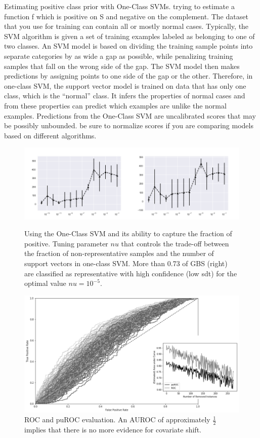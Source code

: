 Estimating positive class prior with One-Class SVMs. trying to estimate a function f which is positive on S and negative on the complement. The dataset that you use for training can contain all or mostly normal cases. Typically, the SVM algorithm is given a set of training examples labeled as belonging to one of two classes. An SVM model is based on dividing the training sample points into separate categories by as wide a gap as possible, while penalizing training samples that fall on the wrong side of the gap. The SVM model then makes predictions by assigning points to one side of the gap or the other. Therefore, in one-class SVM, the support vector model is trained on data that has only one class, which is the “normal” class. It infers the properties of normal cases and from these properties can predict which examples are unlike the normal examples.  Predictions from the One-Class SVM are uncalibrated scores that may be possibly unbounded. be sure to normalize scores if you are comparing models based on different algorithms.

\begin{figure}[ht]
	\begin{center}
		\captionsetup{width= 400pt}
		\includegraphics[scale=0.50,angle=0]{fig/occfigure}
		\label{occ}
		\caption{Using the One-Class SVM and its ability to capture the fraction of positive. Tuning parameter \(nu\) that controls the trade-off between the fraction of non-representative samples and the number of support vectors in one-class SVM. More than 0.73 of GBS (right) are classified as representative with high confidence (low sdt) for the optimal value \(nu = 10^{-5}\).}
	\end{center}
\end{figure}

\begin{figure}[ht]
\centering
		\captionsetup{width= 400pt}
   \includegraphics[scale=0.48,angle=0]{fig/res1}
\caption{ROC and puROC evaluation. An AUROC of approximately \(\frac{1}{2}\) implies that there is no more evidence for covariate shift.}
   \label{fig:Ng1} 
\end{figure}

